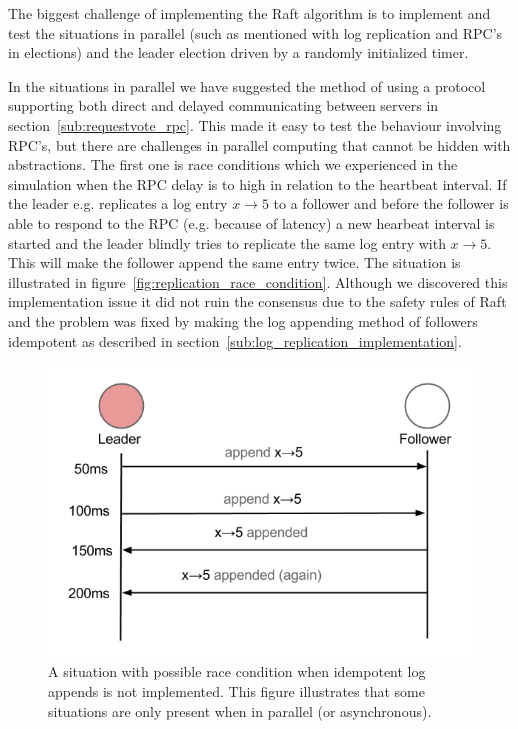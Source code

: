 The biggest challenge of implementing the Raft algorithm is to implement and test the situations in parallel (such as mentioned with log replication and RPC's in elections) and the leader election driven by a randomly initialized timer.

In the situations in parallel we have suggested the method of using a protocol supporting both direct and delayed communicating between servers in section~\ref{sub:requestvote_rpc}. This made it easy to test the behaviour involving RPC's, but there are challenges in parallel computing that cannot be hidden with abstractions. The first one is race conditions which we experienced in the simulation when the RPC delay is to high in relation to the heartbeat interval. If the leader e.g. replicates a log entry $x\rightarrow5$ to a follower and before the follower is able to respond to the RPC (e.g. because of latency) a new hearbeat interval is started and the leader blindly tries to replicate the same log entry with $x\rightarrow5$. This will make the follower append the same entry twice. The situation is illustrated in figure~\ref{fig:replication_race_condition}. Although we discovered this implementation issue it did not ruin the consensus due to the safety rules of Raft and the problem was fixed by making the log appending method of followers idempotent as described in section~\ref{sub:log_replication_implementation}.

\begin{figure}
\centering
\includegraphics[scale = 0.5]{figures/replication_race_condition.png}
\caption{A situation with possible race condition when idempotent log appends is not implemented. This figure illustrates that some situations are only present when in parallel (or asynchronous).}
\label{fig:log_replication_implementation}
\end{figure}


